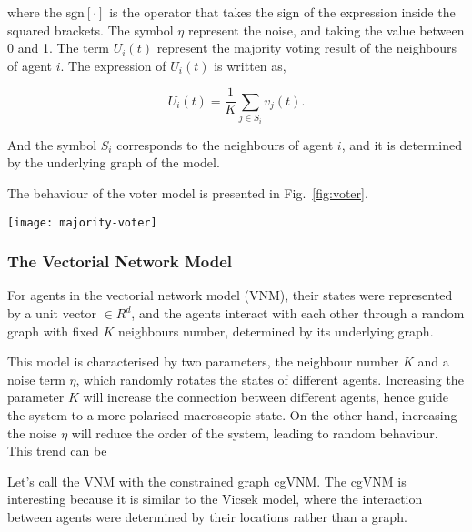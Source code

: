 \documentclass[11pt,twoside]{report}
\begin{document}
\noindent where the $\textrm{sgn}[ \cdot ]$ is the operator that takes the sign of the expression inside the squared brackets. The symbol $\eta$ represent the noise, and taking the value between 0 and 1. The term $U_i(t)$ represent the majority voting result of the neighbours of agent $i$. The expression of $U_i(t)$ is written as,

$$
U_i(t) = \frac{1}{K} \sum_{j \in S_i} v_j(t).
$$

\noindent And the symbol $S_i$ corresponds to the neighbours of agent $i$, and it is determined by the underlying graph of the model.
 
The behaviour of the voter model is presented in Fig.\ \ref{fig:voter}.

\begin{SCfigure}
  \texttt{[image: majority-voter]}
  \caption[The phase behaviour of the voter model]{The behaviour of the voter model with intrinsic noise. (a) The relationship between the polarisation and the noise from the voter model ($K=3$). The scatters are the simulation result of a system ($N=50000$), and the solid line is the prediction of the mean--field theory \cite{pimentel2008PRE}. (b) The polarisation as a function of the connection number ($K$) and the noise. (c) The susceptibility as a function of the connection number ($K$) and the noise.}
  \label{fig:voter}
\end{SCfigure}

\subsubsection*{The Vectorial Network Model}

For agents in the vectorial network model (VNM), their states were represented by a unit vector $\in R^d$, and the agents interact with each other through a random graph with fixed $K$ neighbours number, determined by its underlying graph.

This model is characterised by two parameters, the neighbour number $K$ and a noise term $\eta$, which randomly rotates the states of different agents. Increasing the parameter $K$ will increase the connection between different agents, hence guide the system to a more polarised macroscopic state. On the other hand, increasing the noise $\eta$ will reduce the order of the system, leading to random behaviour. This trend can be 


Let's call the VNM with the constrained graph cgVNM. The cgVNM is interesting because it is similar to the Vicsek model, where the interaction between agents were determined by their locations rather than a graph.
\end{document}
